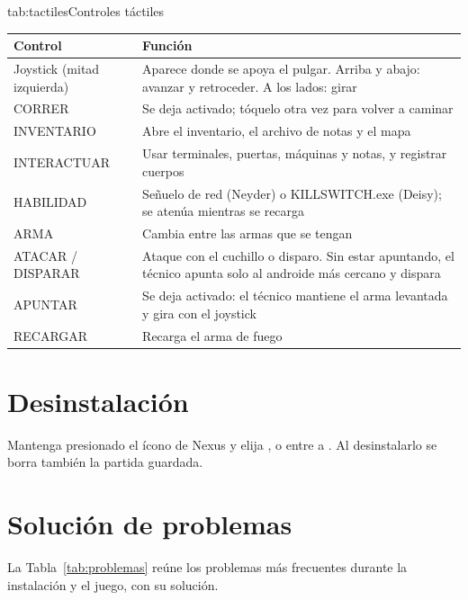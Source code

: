 \documentclass[stu,letterpaper,12pt,donotrepeattitle,floatsintext]{apa7}
\begin{document}
\begin{TablaAPA}{tab:tactiles}{Controles táctiles}
\begin{tabularx}{\linewidth}{P{3.4cm}L}
\toprule
Control & Función \\
\midrule
Joystick (mitad izquierda) & Aparece donde se apoya el pulgar. Arriba y abajo: avanzar y retroceder. A los lados: girar \\
CORRER & Se deja activado; tóquelo otra vez para volver a caminar \\
INVENTARIO & Abre el inventario, el archivo de notas y el mapa \\
INTERACTUAR & Usar terminales, puertas, máquinas y notas, y registrar cuerpos \\
HABILIDAD & Señuelo de red (Neyder) o KILLSWITCH.exe (Deisy); se atenúa mientras se recarga \\
ARMA & Cambia entre las armas que se tengan \\
ATACAR / DISPARAR & Ataque con el cuchillo o disparo. Sin estar apuntando, el técnico apunta solo al androide más cercano y dispara \\
APUNTAR & Se deja activado: el técnico mantiene el arma levantada y gira con el joystick \\
RECARGAR & Recarga el arma de fuego \\
\bottomrule
\end{tabularx}
\end{TablaAPA}

\section{Desinstalación}

Mantenga presionado el ícono de Nexus y elija , o entre a 
\textrightarrow{}  \textrightarrow{}  \textrightarrow{}
. Al desinstalarlo se borra también la partida guardada.

\section{Solución de problemas}

La Tabla~\ref{tab:problemas} reúne los problemas más frecuentes durante la instalación y el juego,
con su solución.
\end{document}
